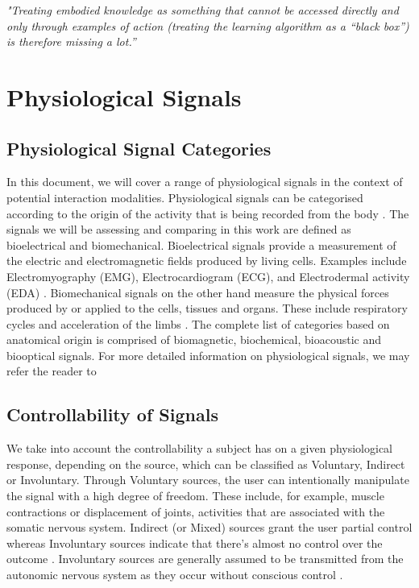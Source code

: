 \textit{"Treating embodied knowledge as something that cannot be accessed directly and only through examples of action (treating the learning algorithm as a “black box”) is therefore missing a lot.” }

\citeauthor{gillies_understanding_2019} \cite{gillies_understanding_2019}


\section{Physiological Signals}

\subsection{Physiological Signal Categories}
\label{subsec:catagories}

In this document, we will cover a range of physiological signals in the context of potential interaction modalities. Physiological signals can be categorised according to the origin of the activity that is being recorded from the body \cite{enderle_introduction_2012}. The signals we will be assessing and comparing in this work are defined as bioelectrical and biomechanical. Bioelectrical signals provide a measurement of the electric and electromagnetic fields produced by living cells. Examples include Electromyography (EMG), Electrocardiogram (ECG), and Electrodermal activity (EDA) \cite{malmivuo_bioelectromagnetismprinciples_1995}. Biomechanical signals on the other hand measure the physical forces produced by or applied to the cells, tissues and organs. These include respiratory cycles and acceleration of the limbs \cite{guerreiro_bitalino_2013, pacelli_sensing_2006}. The complete list of categories based on anatomical origin is comprised of biomagnetic, biochemical, bioacoustic and biooptical signals. For more detailed information on physiological signals, we may refer the reader to \cite{webb_principles_2018}

\subsection{Controllability of Signals}

We take into account the controllability a subject has on a given physiological response, depending on the source, which can be classified as Voluntary, Indirect or Involuntary. Through Voluntary sources, the user can intentionally manipulate the signal with a high degree of freedom. These include, for example, muscle contractions or displacement of joints, activities that are associated with the somatic nervous system. Indirect (or Mixed) sources grant the user partial control whereas Involuntary sources indicate that there's almost no control over the outcome \cite{da_silva_biosignal_2017}. Involuntary sources are generally assumed to be transmitted from the autonomic nervous system as they occur without conscious control \cite{lenman_human_1975}.

